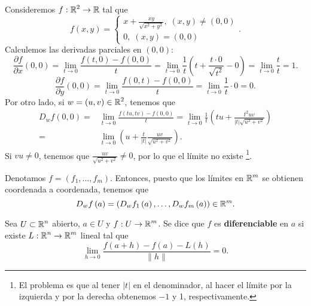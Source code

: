 \begin{eg}
Consideremos $\displaystyle f : \mathbb{R}^{2} \to \mathbb{R} $ tal que 
\[f\left(x,y\right) = 
\begin{cases}
x + \frac{xy}{\sqrt{x^{2}+y^{2}}}, \; \left(x,y\right) \neq \left(0,0\right) \\
0, \; \left(x,y\right) = \left(0,0\right)
\end{cases}
.\]
Calculemos las derivadas parciales en $\displaystyle \left(0,0\right) $:
\[\frac{\partial f}{\partial x}\left(0,0\right) = \lim_{t \to 0}\frac{f\left(t,0\right)-f\left(0,0\right)}{t} = \lim_{t \to 0}\frac{1}{t}\left(t + \frac{t \cdot 0}{\sqrt{t^{2}}}-0\right) = \lim_{t \to 0}\frac{t}{t} = 1 .\]
\[\frac{\partial f}{\partial y}\left(0,0\right) = \lim_{t \to 0}\frac{f\left(0,t\right)-f\left(0,0\right)}{t} = \lim_{t \to 0}\frac{1}{t} \cdot 0 = 0 .\]
Por otro lado, si $\displaystyle w = \left(u,v\right) \in \mathbb{R}^{2} $, tenemos que 
\[
\begin{split}
	D_{w}f\left(0,0\right) = & \lim_{t \to 0}\frac{f\left(tu,tv\right)-f\left(0,0\right)}{t} = \lim_{t \to 0}\frac{1}{t}\left(tu + \frac{t^{2}uv}{ \left|t\right|\sqrt{u^{2}+v^{2}}}\right) \\
	= &  \lim_{t \to 0}\left(u + \frac{t}{ \left|t\right|} \frac{uv}{\sqrt{u^{2}+v^{2}}}\right).
\end{split}
\]
Si $\displaystyle vu \neq 0 $, tenemos que $\displaystyle \frac{uv}{\sqrt{u^{2}+v^{2}}}\neq 0 $, por lo que el límite no existe \footnote{El problema es que al tener $\displaystyle \left|t\right| $ en el denominador, al hacer el límite por la izquierda y por la derecha obtenemos $\displaystyle -1 $ y 1, respectivamente.}.
\end{eg}
\begin{observation}
Denotamos $\displaystyle f = \left(f_{1}, \ldots, f_{m}\right) $. Entonces, puesto que los límites en $\displaystyle \mathbb{R}^{m} $ se obtienen  coordenada a coordenada, tenemos que
\[D_{w}f\left(a\right) = \left(D_{w}f_{1}\left(a\right), \ldots, D_{w}f_{m}\left(a\right)\right) \in \mathbb{R}^{m} .\]
\end{observation}
\begin{definition}[Diferenciabilidad]
Sea $\displaystyle U \subset \mathbb{R}^{n} $ abierto, $\displaystyle a \in U $ y $\displaystyle f : U \to \mathbb{R}^{m} $. Se dice que $\displaystyle f $ es \textbf{diferenciable} en $\displaystyle a $ si existe $\displaystyle L : \mathbb{R}^{n} \to \mathbb{R}^{m} $ lineal tal que 
\[\lim_{h \to 0}\frac{f\left(a+h\right)-f\left(a\right)-L\left(h\right)}{ \|h\|} = 0.\]
\end{definition}
